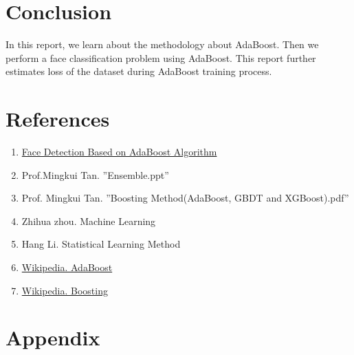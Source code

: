 \documentclass[journal, a4paper, onecolumn]{IEEEtran}
\begin{document}
\begin{multicols}{2}
\section{Conclusion}
In this report, we learn about the methodology about AdaBoost. Then we perform a face classification problem using AdaBoost. This report further estimates loss of the dataset during AdaBoost training process.

\section{References}
\begin{enumerate}
\item \href{https://www.zybuluo.com/liushiya/note/1305570}{Face Detection Based on AdaBoost Algorithm}
\item Prof.Mingkui Tan. ''Ensemble.ppt''
\item Prof. Mingkui Tan. ''Boosting Method(AdaBoost, GBDT and XGBoost).pdf''
\item Zhihua zhou. Machine Learning
\item Hang Li. Statistical Learning Method
\item \href{https://en.wikipedia.org/wiki/AdaBoost}{Wikipedia. AdaBoost}
\item \href{https://en.wikipedia.org/wiki/Boosting_(machine_learning)}{Wikipedia. Boosting} \label{href:Boosting}
\end{enumerate}

\end{multicols}

\newpage

\section{Appendix}
\end{document}
